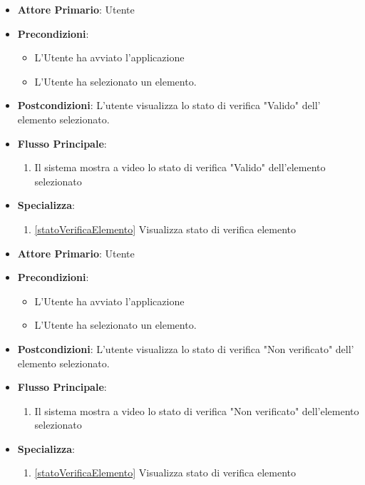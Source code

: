 \begin{itemize}
    \item \textbf{Attore Primario}: Utente
    \item \textbf{Precondizioni}: \begin{itemize}
        \item L'Utente ha avviato l'applicazione
        \item L'Utente ha selezionato un elemento.
    \end{itemize}
    \item \textbf{Postcondizioni}: L'utente visualizza lo stato di verifica "Valido" dell' elemento selezionato.
    \item \textbf{Flusso Principale}:
    \begin{enumerate}
              \item Il sistema mostra a video lo stato di verifica "Valido" dell'elemento selezionato
    \end{enumerate}
    \item \textbf{Specializza}:
    \begin{enumerate}
              \item \ref{statoVerificaElemento} Visualizza stato di verifica elemento
    \end{enumerate}
\end{itemize}

\begin{itemize}
    \item \textbf{Attore Primario}: Utente
    \item \textbf{Precondizioni}: \begin{itemize}
        \item L'Utente ha avviato l'applicazione
        \item L'Utente ha selezionato un elemento.
    \end{itemize}
    \item \textbf{Postcondizioni}: L'utente visualizza lo stato di verifica "Non verificato" dell' elemento selezionato.
    \item \textbf{Flusso Principale}:
    \begin{enumerate}
              \item Il sistema mostra a video lo stato di verifica "Non verificato" dell'elemento selezionato
    \end{enumerate}
    \item \textbf{Specializza}:
    \begin{enumerate}
              \item \ref{statoVerificaElemento} Visualizza stato di verifica elemento
    \end{enumerate}
\end{itemize}

